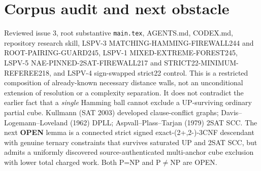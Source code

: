 \documentclass[10pt]{article}
\begin{document}
\section{Corpus audit and next obstacle}
Reviewed issue 3, root substantive \texttt{main.tex}, AGENTS.md,
CODEX.md, repository research skill, LSPV-3
MATCHING-HAMMING-FIREWALL244 and ROOT-PAIRING-GUARD245,
LSPV-1 MIXED-EXTREME-FOREST245, LSPV-5
NAE-PINNED-2SAT-FIREWALL217 and
STRICT22-MINIMUM-REFEREE218, and LSPV-4
sign-swapped strict22 control. This is a restricted
composition of already-known necessary distance walls,
not an unconditional extension of resolution or a complexity
separation. It does not contradict the earlier fact that
a \emph{single} Hamming ball cannot exclude a UP-surviving
ordinary partial cube.
Kullmann (SAT 2003) developed clause-conflict graphs;
Davis--Logemann--Loveland (1962) DPLL;
Aspvall--Plass--Tarjan (1979) 2SAT SCC.
The next \textbf{OPEN} lemma is a connected strict signed
exact-(2+,2-)-3CNF descendant with genuine ternary constraints
that survives saturated UP and 2SAT SCC, but admits a
uniformly discovered source-authenticated multi-anchor
cube exclusion with lower total charged work.
Both P=NP and P$\ne$NP are OPEN.
\end{document}
